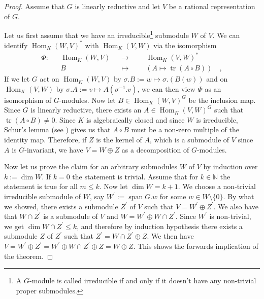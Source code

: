 \begin{proof}
  Assume that $G$ is linearly reductive and let $V$ be a rational representation of $G$.
  
  Let us first assume that we have an irreducible\footnote{A $G$-module is called irreducible if and only if it doesn't have any non-trivial proper submodules.} submodule $W$ of $V$.
  We can identify $\operatorname{Hom}_K(W,V)^\ast$ with $\operatorname{Hom}_K(V,W)$ via the isomorphism
  \begin{equation*}
    \begin{aligned}
      \Phi \colon &&\operatorname{Hom}_K(W,V)&&\longrightarrow&&& \operatorname{Hom}_K(V,W)^\ast  \\
      &&B && \longmapsto&&& (A \mapsto \operatorname{tr}(A \circ B)) \quad ,
    \end{aligned}
  \end{equation*}
  If we let $G$ act on $ \operatorname{Hom}_K(W,V)$ by $\sigma.B :=  w \mapsto \sigma . (B(w))$ and on $\operatorname{Hom}_K(V,W)$ by $ \sigma.A := v \mapsto A(\sigma^{-1}.v) $, we can then view $\Phi$ as an isomorphism of $G$-modules. %
  Now let $B \in \operatorname{Hom}_K(W,V)^G$ be the inclusion map.
  Since $G$ is linearly reductive, there exists an $A \in \operatorname{Hom}_K(V,W)^G$ such that $ \operatorname{tr}( A \circ B) \neq 0$.
  Since $K$ is algebraically closed and since $W$ is irreducible, Schur's lemma (see \cite[1.7]{FH91}) gives us that $A \circ B$ must be a non-zero multiple of the identity map.
  Therefore, if $Z$ is the kernel of $A$, which is a submodule of $V$ since $A$ is $G$-invariant, we have $V = W \oplus Z$ as a decomposition of $G$-modules.
  
  Now let us prove the claim for an arbitrary submodules $W$ of $V$ by induction over $k := \operatorname{dim}W$.
  If $k=0$ the statement is trivial.
  Assume that for $k \in \mathbb{N}$ the statement is true for all $m \leq k$.
  Now let $\operatorname{dim}W = k +1$.
  We choose a non-trivial irreducible submodule of $W$, say $W^\prime := \operatorname{span}G.w$ for some $w \in W \setminus \{0\}$. %
  By what we showed, there exists a submodule $Z^\prime$ of $V$ such that $V = W^\prime \oplus Z^\prime$.
  We also have that $W \cap Z^\prime$ is a submodule of $V$ and $W = W^\prime \oplus W \cap Z^\prime$.
  Since $W^\prime$ is non-trivial, we get $\operatorname{dim} W \cap Z^\prime \leq k$, and therefore by induction hypothesis there exists a submodule $Z$ of $Z^\prime$ such that $Z^\prime = W \cap Z^\prime \oplus Z$.
  We then have $V = W^\prime \oplus Z^\prime = W^\prime \oplus W \cap Z^\prime \oplus Z = W \oplus Z$.
  This shows the forwards implication of the theorem.
  

\end{proof}
